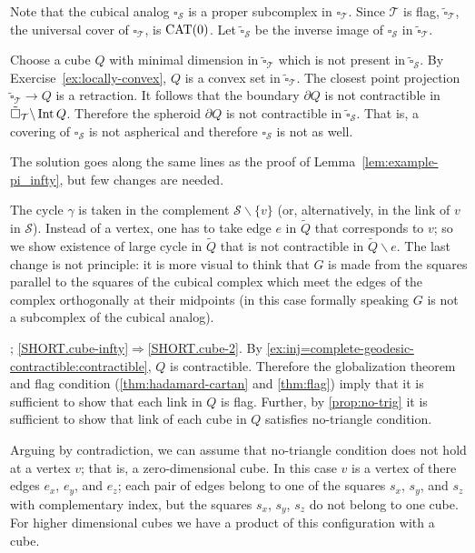 Note that the cubical analog $\square_{\mathcal{S}}$ is a proper subcomplex in $\square_{\mathcal{T}}$.
Since $\mathcal{T}$ is flag,
$\tilde\square_{\mathcal{T}}$,
the universal cover of $\square_{\mathcal{T}}$, is $\mathrm{CAT}(0)$.
Let $\tilde\square_{\mathcal{S}}$ be the inverse image of $\square_{\mathcal{S}}$ in $\tilde\square_{\mathcal{T}}$.

Choose a cube $Q$ with minimal dimension in $\tilde\square_{\mathcal{T}}$ which is not present in $\tilde\square_{\mathcal{S}}$.
By Exercise~\ref{ex:locally-convex}, $Q$ is a convex set in $\tilde\square_{\mathcal{T}}$.
The closest point projection $\tilde\square_{\mathcal{T}}\to Q$ is a retraction.
It follows that the boundary $\partial Q$ is not contractible in $\tilde\square_{\mathcal{T}}\backslash\operatorname{\rm Int}\nolimits Q$.
Therefore the spheroid $\partial Q$ is not contractible in $\tilde\square_{\mathcal{S}}$.
That is, a covering of $\square_{\mathcal{S}}$ is not aspherical and therefore $\square_{\mathcal{S}}$ is not as well.

The solution goes along the same lines as the proof of Lemma~\ref{lem:example-pi_infty}, but few changes are needed.

The cycle $\gamma$ is taken in the complement $\mathcal{S}\backslash\{v\}$ (or, alternatively, in the link of $v$ in $\mathcal{S}$).
Instead of a vertex, one has to take edge $e$ in $\tilde Q$ that corresponds to $v$; so we show existence of large cycle in $\tilde Q$ that is not contractible in $\tilde Q\backslash e$.
The last change is not principle:
it is more visual to think that $G$ is made from the squares parallel to the squares of the cubical complex which meet the edges of the complex orthogonally at their midpoints (in this case formally speaking $G$ is not a subcomplex of the cubical analog).

; \ref{SHORT.cube-infty}$\Rightarrow$\ref{SHORT.cube-2}.
By \ref{ex:inj=complete-geodesic-contractible:contractible}, $Q$ is contractible.
Therefore the globalization theorem and flag condition (\ref{thm:hadamard-cartan} and \ref{thm:flag}) imply that it is sufficient to show that each link in $Q$ is flag.
Further, by \ref{prop:no-trig} it is sufficient to show that link of each cube in $Q$ satisfies no-triangle condition.

Arguing by contradiction, we can assume that no-triangle condition does not hold at a vertex $v$; that is, a zero-dimensional cube.
In this case $v$ is a vertex of there edges $e_x$, $e_y$, and $e_z$;
each pair of edges belong to one of the squares $s_x$, $s_y$, and $s_z$ with complementary index, but the squares $s_x$, $s_y$, $s_z$ do not belong to one cube.
For higher dimensional cubes we have a product of this configuration with a cube.

